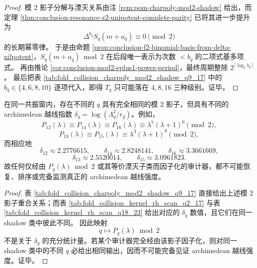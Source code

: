 \begin{proof}
模 \(2\) 影子分解与湮灭关系由注 \ref{rem:pom-charpoly-mod2-shadow} 给出，而定理 \ref{thm:conclusion-resonance-z2-unipotent-complete-parity} 已将其进一步提升为
\[
\Delta^{b_q}S_q(m+a_q)\equiv 0\pmod 2
\]
的长期幂零律。
于是由命题 \ref{prop:conclusion-f2-binomial-basis-from-delta-nilpotent}，\(S_q(m+a_q)\bmod 2\) 在后段唯一表示为次数 \(<b_q\) 的二项式基多项式。
再由推论 \ref{cor:conclusion-mod2-eplus1-power-period}，最终周期整除 \(2^{\lceil\log_2 b_q\rceil}\)。
最后把表 \ref{tab:fold_collision_charpoly_mod2_shadow_q9_17} 中的 \(b_q\in\{4,6,8,10\}\) 逐项代入，即得 \(T_q\) 只可能落在 \(4,8,16\) 三种级别。证毕。
\end{proof}

\begin{corollary}\label{cor:conclusion-mod2-shadow-insufficient-for-archimedean-instability}
在同一共振窗内，存在不同的 \(q\) 具有完全相同的模 \(2\) 影子，但具有不同的 archimedean 越线指数 \(\delta_q=\log(\Lambda_q^2/r_q)\)。例如，
\[
P_{12}(\lambda)\equiv P_{14}(\lambda)\equiv P_{16}(\lambda)\equiv \lambda^7(\lambda+1)^6\pmod 2,
\]
\[
P_{13}(\lambda)\equiv P_{15}(\lambda)\equiv \lambda^3(\lambda+1)^8\pmod 2,
\]
而相应地
\[
\delta_{12}\approx 2.2776615,\qquad
\delta_{14}\approx 2.8248141,\qquad
\delta_{16}\approx 3.3661669,
\]
\[
\delta_{13}\approx 2.5520014,\qquad
\delta_{15}\approx 3.0961823.
\]
故任何仅经由 \(P_q(\lambda)\bmod 2\) 或其等价湮灭子类而因子化的审计器，都不可能恢复、排序或完备监测真正的 archimedean 越线强度。
\end{corollary}

\begin{proof}
表 \ref{tab:fold_collision_charpoly_mod2_shadow_q9_17} 直接给出上述模 \(2\) 影子重合关系；而表 \ref{tab:fold_collision_kernel_rh_scan_q2_17} 与表 \ref{tab:fold_collision_kernel_rh_scan_q18_23} 给出对应的 \(\delta_q\) 数值，且它们在同一 shadow 类中彼此不同。
因此映射
\[
q\longmapsto P_q(\lambda)\bmod 2
\]
不是关于 \(\delta_q\) 的充分统计量。若某个审计器完全经由该影子因子化，则对同一 shadow 类中的不同 \(q\) 必给出相同输出，因而不可能完备见证 archimedean 越线强度。证毕。
\end{proof}



